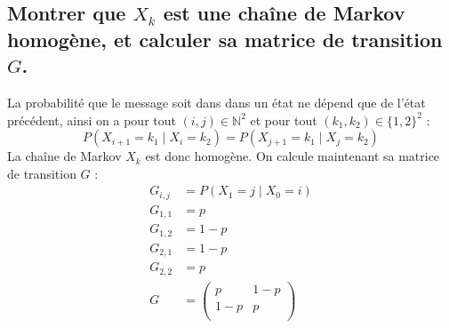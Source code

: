 \documentclass[10pt,a4paper,twoside]{article}
\begin{document}
\subsection{Montrer que $X_{k}$ est une chaîne de Markov homogène, et calculer sa matrice de transition $G$.}
La probabilité que le message soit dans dans un état ne dépend que de l'état précédent, ainsi on a pour tout $(i,j) \in \mathbb{N}^{2}$ et pour tout $(k_{1},k_{2}) \in \{1,2\}^{2}$ :
\[ P(X_{i+1}=k_{1}\mid X_{i}=k_{2}) = P(X_{j+1}=k_{1}\mid X_{j}=k_{2}) \]
La chaîne de Markov $X_{k}$ est donc homogène. On calcule maintenant sa matrice de transition $G$ :
\begin{align*}
G_{i,j} &= P(X_{1}=j\mid X_{0}=i)\\
G_{1,1} &= p\\
G_{1,2} &= 1-p\\
G_{2,1} &= 1-p\\
G_{2,2} &= p\\
G &= \left(\begin{array}{cc}
p & 1-p \\
1-p & p \\
\end{array}\right)\\
\end{align*}
\end{document}
